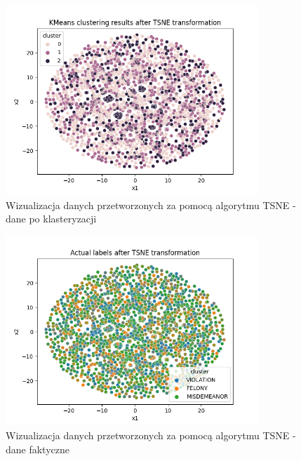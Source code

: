 \documentclass{classrep}
\begin{document}
{{{                 \begin{figure}[!htbp]
                    \centering
                    \includegraphics[width=0.85\textwidth]{img/clustering/tsne_crime_codes_clusters.png}
                    \caption{Wizualizacja danych przetworzonych za pomocą algorytmu TSNE - dane po klasteryzacji}
                    \label{tsne_clusters}
                \end{figure}
                \FloatBarrier
                
                \begin{figure}[!htbp]
                    \centering
                    \includegraphics[width=0.85\textwidth]{img/clustering/tsne_crime_codes_actual.png}
                    \caption{Wizualizacja danych przetworzonych za pomocą algorytmu TSNE - dane faktyczne}
                    \label{tsne_actual}
                \end{figure}
                \FloatBarrier

}}}
\end{document}
